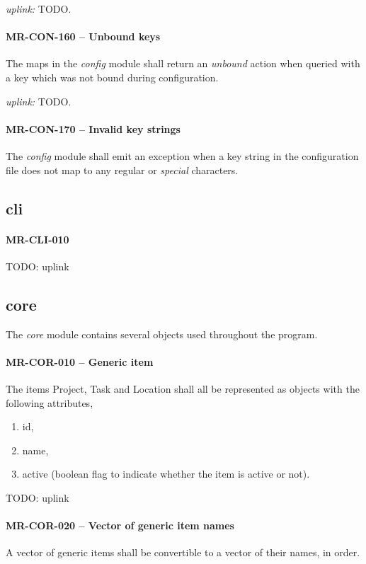 \textit{uplink: } TODO.

\paragraph{MR-CON-160 -- Unbound keys}
The maps in the \emph{config} module shall return an \emph{unbound}
action when queried with a key which was not bound during configuration.

\textit{uplink: } TODO.

\paragraph{MR-CON-170 -- Invalid key strings}
The \emph{config} module shall emit an exception when a key
string in the configuration file does not map to any regular or \emph{special}
characters.

\subsection{cli}
\paragraph{MR-CLI-010}
TODO: uplink

\subsection{core}
The \emph{core} module contains several objects used throughout the program.

\paragraph{MR-COR-010 -- Generic item}
The items Project, Task and Location shall all be represented as objects with
the following attributes,
\begin{enumerate}
\item id,
\item name,
\item active (boolean flag to indicate whether the item is active or not).
\end{enumerate}
TODO: uplink

\paragraph{MR-COR-020 -- Vector of generic item names}
A vector of generic items shall be convertible to a vector of their names,
in order.

